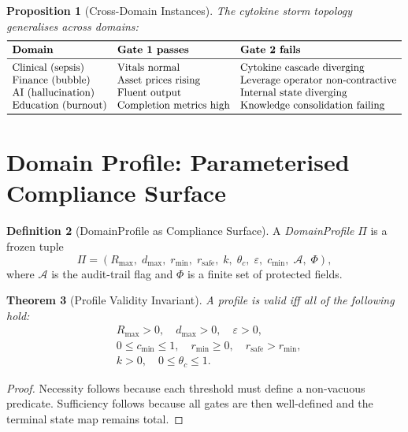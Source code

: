 \documentclass[11pt,a4paper]{article}
\theoremstyle{tealstyle}
\newtheorem{theorem}{Theorem}[section]
\newtheorem{proposition}[theorem]{Proposition}
\theoremstyle{definition}
\newtheorem{definition}[theorem]{Definition}
\newcommand{\eps}{\varepsilon}
\newcommand{\Rmax}{R_{\max}}
\begin{document}
\begin{proposition}[Cross-Domain Instances]
\label{prop:crossdomain}
The cytokine storm topology generalises across domains:
\[
\begin{array}{lll}
\toprule
\textbf{Domain} & \textbf{Gate 1 passes} & \textbf{Gate 2 fails} \\
\midrule
\text{Clinical (sepsis)} & \text{Vitals normal} & \text{Cytokine cascade diverging} \\
\text{Finance (bubble)} & \text{Asset prices rising} & \text{Leverage operator non-contractive} \\
\text{AI (hallucination)} & \text{Fluent output} & \text{Internal state diverging} \\
\text{Education (burnout)} & \text{Completion metrics high} & \text{Knowledge consolidation failing} \\
\bottomrule
\end{array}
\]
\end{proposition}

\section{Domain Profile: Parameterised Compliance Surface}
\label{sec:profiles}

\begin{definition}[DomainProfile as Compliance Surface]
\label{def:profile}
A \emph{DomainProfile} $\Pi$ is a frozen tuple
\[
  \Pi = (\Rmax,\; d_{\max},\; r_{\min},\; r_{\mathrm{safe}},\;
         k,\; \theta_c,\; \eps,\; c_{\min},\; \mathcal{A},\; \Phi),
\]
where $\mathcal{A}$ is the audit-trail flag and
$\Phi$ is a finite set of protected fields.
\end{definition}

\begin{theorem}[Profile Validity Invariant]
\label{thm:profile-valid}
A profile is valid iff all of the following hold:
\[
\begin{aligned}
  &\Rmax > 0, \quad d_{\max} > 0, \quad \eps > 0, \\
  &0 \le c_{\min} \le 1, \quad r_{\min} \ge 0, \quad r_{\mathrm{safe}} > r_{\min}, \\
  &k > 0, \quad 0 \le \theta_c \le 1.
\end{aligned}
\]
\end{theorem}

\begin{proof}
Necessity follows because each threshold must define a non-vacuous predicate.
Sufficiency follows because all gates are then well-defined and the terminal
state map remains total.
\end{proof}
\end{document}
